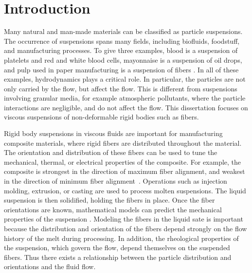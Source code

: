 \chapter{Introduction}

Many natural and man-made materials can be classified as particle suspensions. The occurrence of suspensions spans many fields, including biofluids, foodstuff, and manufacturing processes.  To give three examples, blood is a suspension of platelets and red and white blood cells, mayonnaise is a suspension of oil drops, and pulp used in paper manufacturing is a suspension of fibers \cite{Larson1999}. In all of these examples, hydrodynamics plays a critical role. In particular, the particles are not only carried by the flow, but affect the flow. This is different from suspensions involving granular media, for example atmospheric pollutants, where the particle interactions are negligible, and do not affect the flow. This dissertation focuses on viscous suspensions of non-deformable rigid bodies such as fibers. 

Rigid body suspensions in viscous fluids are important for manufacturing composite materials, where rigid fibers are distributed throughout the material. The orientation and distribution of these fibers can be used to tune the mechanical, thermal, or electrical properties of the composite. For example, the composite is strongest in the direction of maximum fiber alignment, and weakest in the direction of minimum fiber alignment~\cite{Folgar1984}. Operations such as injection molding, extrusion, or casting are used to process molten suspensions. The liquid suspension is then solidified, holding the fibers in place. Once the fiber orientations are known, mathematical models can predict the mechanical properties of the suspension \cite{Advani1987}. Modeling the fibers in the liquid sate is important because the distribution and orientation of the fibers depend strongly on the flow history of the melt during processing. In addition, the rheological properties of the suspension, which govern the flow, depend themselves on the suspended fibers. Thus there exists a relationship between the particle distribution and orientations and the fluid flow. 


